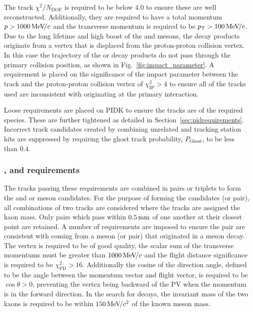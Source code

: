 The track $\chi^{2}/N_{\text{DOF}}$ is required to be below $4.0$ to ensure these are well reconstructed. Additionally, they are required to have a total momentum $\mbox{$p$} > 1000 {\mathrm{\,Me\kern -0.1em V\!/}c}$ and the transverse momentum is required to be $\mbox{$p_{\mathrm{ T}}$} > 100 {\mathrm{\,Me\kern -0.1em V\!/}c}$.
Due to the long lifetime and high boost of the \Bp and \D mesons, the decay products originate from a vertex that is displaced from the proton-proton collision vertex. In this case the trajectory of the \Bp or \D decay products do not pass through the primary collision position, as shown in Fig.~\ref{fig:impact_parameter}. A requirement is placed on the significance of the impact parameter between the track and the proton-proton collision vertex of $\chi^{2}_{\text{IP}} > 4$ to ensure all of the tracks used are inconsistent with originating at the primary interaction.  


Loose requirements are placed on PIDK to ensure the tracks are of the required species. These are further tightened as detailed in Section~\ref{sec:pidrequirements}. Incorrect track candidates created by combining unrelated \velo and tracking station hits are suppressed by requiring the ghost track probability, $P_{\text{Ghost}}$, to be less than $0.4$. 

\subsubsection{\Dzb, \phiz and \Dsp requirements}
The tracks passing these requirements are combined in pairs or triplets to form the \Dsp and \phiz or \Dzb meson candidates.  
For the purpose of forming the \phiz candidates (or \Kp\Km pair), all combinations of two tracks are considered where the tracks are assigned the kaon mass. Only pairs which pass within $0.5\mathrm{ \,mm}$ of one another at their closest point are retained. A number of requirements are imposed to ensure the pair are consistent with coming from a \phiz meson (or \Kp\Km pair) that originated in a \Bp meson decay. The vertex is required to be of good quality, the scalar sum of the transverse momentums must be greater than $1000{\mathrm{\,Me\kern -0.1em V\!/}c}$ and the flight distance significance is required to be $\chi^{2}_{\text{FD} } > 16$. Additionally the cosine of the direction angle, defined to be the angle between the momentum vector and flight vector, is required to be $\cos{\theta}>0$, preventing the vertex being backward of the PV when the momentum is in the forward direction. In the search for \decay{\Bp}{\Dsp\phiz} decays, the invariant mass of the two kaons is required to be within $150{\mathrm{\,Me\kern -0.1em V\!/}c^2}$ of the known \phiz meson mass.  

